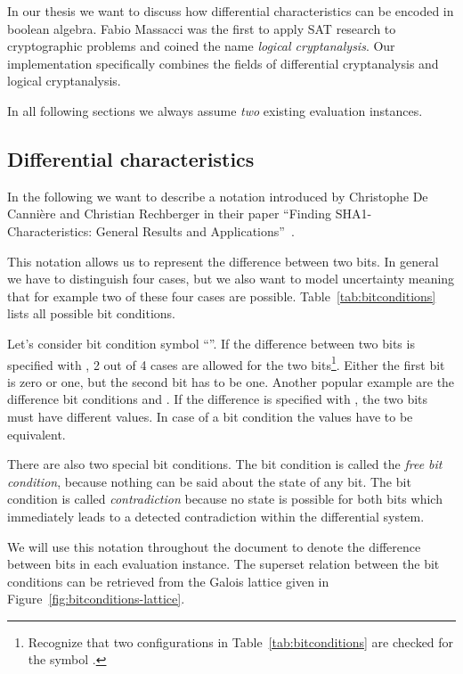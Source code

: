 In our thesis we want to discuss how differential characteristics can be encoded in boolean algebra. Fabio Massacci was the first to apply SAT research to cryptographic problems and coined the name \emph{logical cryptanalysis}. Our implementation specifically combines the fields of differential cryptanalysis and logical cryptanalysis.

In all following sections we always assume \emph{two} existing evaluation instances.

\subsection{Differential characteristics}
\label{sec:differential-characteristic}
%
In the following we want to describe a notation introduced by Christophe De Cannière and Christian Rechberger in their paper ``Finding SHA1-Characteristics: General Results and Applications''~\cite{Cry01}.

This notation allows us to represent the difference between two bits. In general we have to distinguish four cases, but we also want to model uncertainty meaning that for example two of these four cases are possible. Table~\ref{tab:bitconditions} lists all possible bit conditions.

Let's consider bit condition symbol ``''. If the difference between two bits is specified with , 2 out of 4 cases are allowed for the two bits\footnote{Recognize that two configurations in Table~\ref{tab:bitconditions} are checked for the symbol .}. Either the first bit is zero or one, but the second bit has to be one. Another popular example are the difference bit conditions  and \bc{\textendash}. If the difference is specified with , the two bits must have different values. In case of a bit condition \bc{\textendash} the values have to be equivalent.

There are also two special bit conditions. The bit condition  is called the \emph{free bit condition}, because nothing can be said about the state of any bit. The bit condition \bc{\#} is called \emph{contradiction} because no state is possible for both bits which immediately leads to a detected contradiction within the differential system.

We will use this notation throughout the document to denote the difference between bits in each evaluation instance. The superset relation between the bit conditions can be retrieved from the Galois lattice given in Figure~\ref{fig:bitconditions-lattice}.

